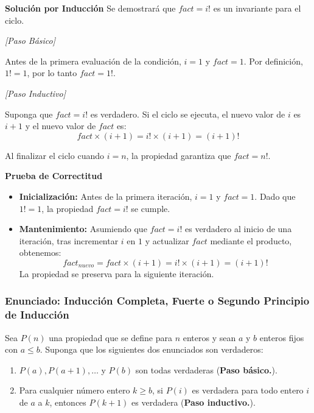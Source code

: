 \documentclass{article}
\begin{document}
\noindent \textbf{Solución por Inducción}
Se demostrará que $fact = i!$ es un invariante para el ciclo. \bigskip

\textit{[Paso Básico]} 

Antes de la primera evaluación de la condición, $i = 1$ y $fact = 1$. Por definición, $1! = 1$, por lo tanto $fact = 1!$.

\bigskip

\textit{[Paso Inductivo]} 

Suponga que $fact = i!$ es verdadero. Si el ciclo se ejecuta, el nuevo valor de $i$ es $i + 1$ y el nuevo valor de $fact$ es:
    \[ fact \times (i + 1) = i! \times (i + 1) = (i + 1)! \]

Al finalizar el ciclo cuando $i = n$, la propiedad garantiza que $fact = n!$. \bigskip

\noindent \textbf{Prueba de Correctitud}

\begin{itemize}
    \item \textbf{Inicialización:} Antes de la primera iteración, $i = 1$ y $fact = 1$. Dado que $1! = 1$, la propiedad $fact = i!$ se cumple.
    \item \textbf{Mantenimiento:} Asumiendo que $fact = i!$ es verdadero al inicio de una iteración, tras incrementar $i$ en $1$ y actualizar $fact$ mediante el producto, obtenemos:
    \[
    fact_{nuevo} = fact \times (i + 1) = i! \times (i + 1) = (i + 1)!
    \]
    La propiedad se preserva para la siguiente iteración.
\end{itemize}

\subsubsection{Enunciado: Inducción Completa, Fuerte o Segundo Principio de Inducción}
\label{sec:induccion-fuerte}

Sea $P(n)$ una propiedad que se define para $n$ enteros y sean $a$ y $b$ enteros fijos con $a \leq b$. Suponga que los siguientes dos enunciados son verdaderos:

\begin{enumerate}
    \item $P(a), P(a + 1), \dots$ y $P(b)$ son todas verdaderas (\textbf{Paso básico.}).
    \item Para cualquier número entero $k \geq b$, si $P(i)$ es verdadera para todo entero $i$ de $a$ a $k$, entonces $P(k + 1)$ es verdadera (\textbf{Paso inductivo.}).
\end{enumerate}
\end{document}

